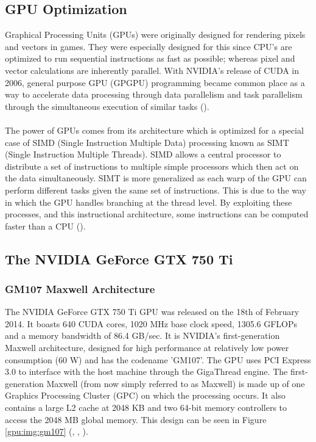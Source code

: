 \subsection{GPU Optimization}\label{gpu:sec:opt}
Graphical Processing Units (GPUs) were originally designed for rendering pixels and vectors in games. They were especially designed for this since CPU's are optimized to run sequential instructions as fast as possible; whereas pixel and vector calculations are inherently parallel. With NVIDIA's release of CUDA in 2006, general purpose GPU (GPGPU) programming became common place as a way to accelerate data processing through data parallelism and task parallelism through the simultaneous execution of similar tasks (\cite{nvidia_cuda}).
\\
\\
The power of GPUs comes from its architecture which is optimized for a special case of SIMD (Single Instruction Multiple Data) processing known as SIMT (Single Instruction Multiple Threads). SIMD allows a central processor to distribute a set of instructions to multiple simple processors which then act on the data simultaneously. SIMT is more generalized as each warp of the GPU can perform different tasks given the same set of instructions. This is due to the way in which the GPU handles branching at the thread level. By exploiting these processes, and this instructional architecture, some instructions can be computed faster than a CPU (\cite{vuduc2013brief}).
\subsection{The NVIDIA GeForce GTX 750 Ti}\label{gpu:sec:750}
%
\subsubsection{GM107 Maxwell Architecture}\label{gpu:ssec:max}
The NVIDIA GeForce GTX 750 Ti GPU was released on the 18th of February 2014. It boasts 640 CUDA cores, 1020 MHz base clock speed, 1305.6 GFLOPs and a memory bandwidth of 86.4 GB/sec. It is NVIDIA's first-generation Maxwell architecture, designed for high performance at relatively low power consumption (60 W) and has the codename 'GM107'. The GPU uses PCI Express 3.0 to interface with the host machine through the GigaThread engine. The first-generation Maxwell (from now simply referred to as Maxwell) is made up of one Graphics Processing Cluster (GPC) on which the processing occurs. It also contains a large L2 cache at 2048 KB and two 64-bit memory controllers to access the 2048 MB global memory. This design can be seen in Figure \ref{gpu:img:gm107} (\cite{geforce_750}, \cite{g750_specs}, \cite{g750_paper}).
%
